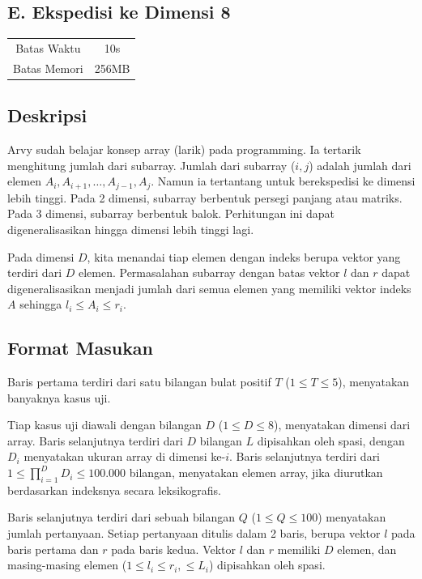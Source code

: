 \documentclass{article}
\begin{document}
\begin{center}
    \section*{E. Ekspedisi ke Dimensi 8} %

    \begin{tabular}{ | c c | }
        \hline
        Batas Waktu  & 10s \\ 
        Batas Memori & 256MB \\
        \hline
    \end{tabular}
\end{center}

\subsection*{Deskripsi}

Arvy sudah belajar konsep array (larik) pada programming.
Ia tertarik menghitung jumlah dari subarray.
Jumlah dari subarray ($i, j$) adalah jumlah dari elemen $A_i, A_{i+1}, \dots, A_{j-1}, A_j$.
Namun ia tertantang untuk berekspedisi ke dimensi lebih tinggi.
Pada 2 dimensi, subarray berbentuk persegi panjang atau matriks.
Pada 3 dimensi, subarray berbentuk balok.
Perhitungan ini dapat digeneralisasikan hingga dimensi lebih tinggi lagi.

Pada dimensi $D$, kita menandai tiap elemen dengan indeks berupa vektor yang terdiri dari $D$ elemen.
Permasalahan subarray dengan batas vektor $l$ dan $r$ dapat digeneralisasikan menjadi jumlah dari semua elemen yang memiliki vektor indeks $A$ sehingga $l_i \leq A_i \leq r_i$.

\subsection*{Format Masukan}

Baris pertama terdiri dari satu bilangan bulat positif $T$ ($1 \leq T \leq 5$), menyatakan banyaknya kasus uji.

Tiap kasus uji diawali dengan bilangan $D$ ($1 \leq D \leq 8$), menyatakan dimensi dari array.
Baris selanjutnya terdiri dari $D$ bilangan $L$ dipisahkan oleh spasi, dengan $D_i$ menyatakan ukuran array di dimensi ke-$i$.
Baris selanjutnya terdiri dari $1 \leq \prod_{i=1}^{D}{D_i} \leq 100.000$ bilangan, menyatakan elemen array, jika diurutkan berdasarkan indeksnya secara leksikografis.

Baris selanjutnya terdiri dari sebuah bilangan $Q$ ($1 \leq Q \leq 100$) menyatakan jumlah pertanyaan.
Setiap pertanyaan ditulis dalam 2 baris, berupa vektor $l$ pada baris pertama dan $r$ pada baris kedua. Vektor $l$ dan $r$ memiliki $D$ elemen, dan masing-masing elemen ($1 \leq l_i \leq r_i, \leq L_i$) dipisahkan oleh spasi.
\end{document}
